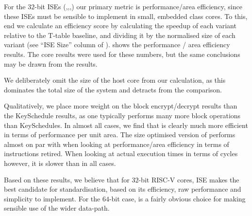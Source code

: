 For the $32$-bit ISEs 
(,,,)
our primary metric is
performance/area efficiency, since these ISEs must be sensible to
implement in small, embedded class cores.
To this, end we calculate an efficiency score by calculating the speedup
of each variant relative to the T-table baseline, and dividing it
by the normalised size of each variant
(see ``ISE Size'' column of ).
 shows the performance / area efficiency results.
The  core results were used for these numbers, but the
same conclusions may be drawn from the  results.

We deliberately omit the size of the host core from our calculation,
as this dominates the total size of the system and detracts from
the comparison.

Qualitatively, we place more weight on the block encrypt/decrypt results
than the KeySchedule results, as one typically performs many more
block operations than KeySchedules.
In almost all cases, we find that  is clearly much more
efficient in terms of performance per unit area.
The size optimised version of  performs almost on par with
 when looking at performance/area efficiency in terms of
instructions retired.
When looking at actual execution times in terms of cycles however,
it is slower than  in all cases.

Based on these results, we believe that for $32$-bit RISC-V cores,
ISE  makes the best candidate for standardisation,
based on its efficiency, raw performance and simplicity to implement.
For the $64$-bit case,  is a fairly obvious choice for making
sensible use of the wider data-path.

